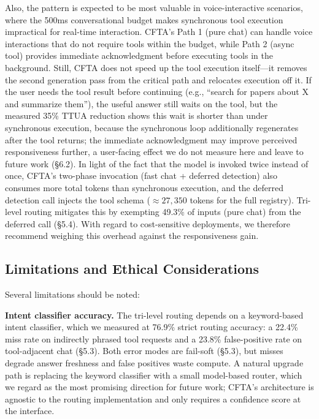 \documentclass[numbered,mediumone,traditional]{oup-authoring-template}
\begin{document}
Also, the pattern is expected to be most valuable in voice-interactive scenarios, where the 500ms conversational budget makes synchronous tool execution impractical for real-time interaction. CFTA's Path 1 (pure chat) can handle voice interactions that do not require tools within the budget, while Path 2 (async tool) provides immediate acknowledgment before executing tools in the background. Still, CFTA does not speed up the tool execution itself---it removes the second generation pass from the critical path and relocates execution off it. If the user needs the tool result before continuing (e.g., ``search for papers about X and summarize them''), the useful answer still waits on the tool, but the measured 35\% TTUA reduction shows this wait is shorter than under synchronous execution, because the synchronous loop additionally regenerates after the tool returns; the immediate acknowledgment may improve perceived responsiveness further, a user-facing effect we do not measure here and leave to future work (\S6.2). In light of the fact that the model is invoked twice instead of once, CFTA's two-phase invocation (fast chat + deferred detection) also consumes more total tokens than synchronous execution, and the deferred detection call injects the tool schema ($\approx 27{,}350$ tokens for the full registry). Tri-level routing mitigates this by exempting 49.3\% of inputs (pure chat) from the deferred call (\S5.4). With regard to cost-sensitive deployments, we therefore recommend weighing this overhead against the responsiveness gain.

\subsection{Limitations and Ethical Considerations}

Several limitations should be noted:

\textbf{Intent classifier accuracy.} The tri-level routing depends on a keyword-based intent classifier, which we measured at 76.9\% strict routing accuracy: a 22.4\% miss rate on indirectly phrased tool requests and a 23.8\% false-positive rate on tool-adjacent chat (\S5.3). Both error modes are fail-soft (\S5.3), but misses degrade answer freshness and false positives waste compute. A natural upgrade path is replacing the keyword classifier with a small model-based router, which we regard as the most promising direction for future work; CFTA's architecture is agnostic to the routing implementation and only requires a confidence score at the interface.
\end{document}
